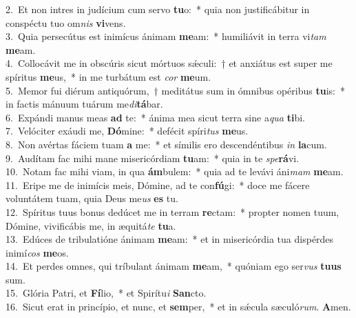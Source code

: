 {2.~}Et non intres in judícium cum servo \textbf{tu}o:~* quia non justificábitur in conspéctu tuo om\textit{nis} \textbf{vi}vens.\\
{3.~}Quia persecútus est inimícus ánimam \textbf{me}am:~* humiliávit in terra vi\textit{tam} \textbf{me}am.\\
{4.~}Collocávit me in obscúris sicut mórtuos sǽculi:~† et anxiátus est super me spíritus \textbf{me}us,~* in me turbátum est \textit{cor} \textbf{me}um.\\
{5.~}Memor fui diérum antiquórum,~† meditátus sum in ómnibus opéribus \textbf{tu}is:~* in factis mánuum tuárum me\textit{di}\textbf{tá}bar.\\
{6.~}Expándi manus meas \textbf{ad} te:~* ánima mea sicut terra sine a\textit{qua} \textbf{ti}bi.\\
{7.~}Velóciter exáudi me, \textbf{Dó}mine:~* defécit spíri\textit{tus} \textbf{me}us.\\
{8.~}Non avértas fáciem tuam \textbf{a} me:~* et símilis ero descendéntibus \textit{in} \textbf{la}cum.\\
{9.~}Audítam fac mihi mane misericórdiam \textbf{tu}am:~* quia in te \textit{spe}\textbf{rá}vi.\\
{10.~}Notam fac mihi viam, in qua \textbf{ám}bulem:~* quia ad te levávi áni\textit{mam} \textbf{me}am.\\
{11.~}Eripe me de inimícis meis, Dómine, ad te con\textbf{fú}gi:~* doce me fácere voluntátem tuam, quia Deus me\textit{us} \textbf{es} tu.\\
{12.~}Spíritus tuus bonus dedúcet me in terram \textbf{re}ctam:~* propter nomen tuum, Dómine, vivificábis me, in æquitá\textit{te} \textbf{tu}a.\\
{13.~}Edúces de tribulatióne ánimam \textbf{me}am:~* et in misericórdia tua dispérdes inimí\textit{cos} \textbf{me}os.\\
{14.~}Et perdes omnes, qui tríbulant ánimam \textbf{me}am,~* quóniam ego ser\textit{vus} \textbf{tu}\textbf{us} sum.\\
{15.~}Glória Patri, et \textbf{Fí}lio,~* et Spirítu\textit{i} \textbf{San}cto.\\
{16.~}Sicut erat in princípio, et nunc, et \textbf{sem}per,~* et in sǽcula sæculó\textit{rum}. \textbf{A}men.\\
